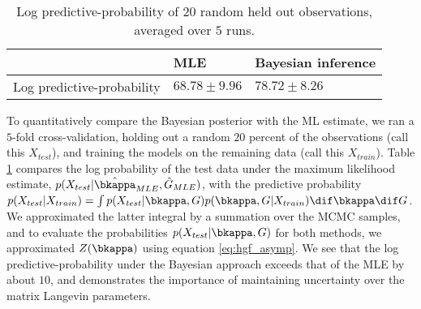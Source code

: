\begin{table}
\caption{Log predictive-probability of $20$ random held out observations, averaged over $5$ runs.}
\begin{tabular}{|l|l|l|}
\hline
  & MLE & Bayesian inference \\
\hline
Log predictive-probability & $68.78\pm 9.96$ & $78.72 \pm 8.26$ \\
\hline
\end{tabular}
  \label{tbl:cross_val}
\end{table}


To quantitatively compare the Bayesian posterior with the ML estimate, we ran a $5$-fold cross-validation,
holding out a random $20$ percent of the observations (call this $X_{test}$), and training the models on the remaining data (call this
$X_{train}$). Table \ref{tbl:cross_val} compares the log probability of the test data under the maximum likelihood estimate, $p(X_{test}|\hat{\bkappa}_{MLE}, \hat{G}_{MLE})$,
with the predictive probability $p(X_{test}|X_{train}) = \int p(X_{test}|\bkappa,G) p(\bkappa,G|X_{train}) \dif \bkappa \dif G$. We approximated
the latter integral by a summation over the MCMC samples, and to evaluate the probabilities $p(X_{test}|\bkappa, G)$ for both methods,
we approximated $Z(\bkappa)$ using equation \eqref{eq:hgf_asymp}.
We see that the log predictive-probability under the Bayesian approach exceeds that of the MLE by about $10$, and demonstrates the importance
of maintaining uncertainty over the matrix Langevin parameters.

